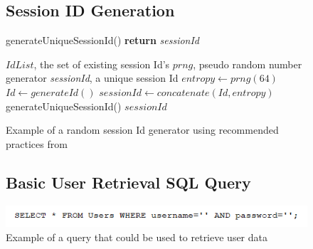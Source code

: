 \documentclass{ueacmpstyle}
\begin{document}
          \begin{figure}[ht]
            \subsection{Session ID Generation}
            \label{sec:session-id-gen}
            \centering
            \begin{algorithm}[H]
            \caption{generateUniqueSessionId() {\bf return} \emph{sessionId}}
              \begin{algorithmic}[1]
                \Require $IdList$, the set of existing session Id's
                \Require $prng$, pseudo random number generator
                \Ensure \emph{sessionId}, a unique session Id
                \State $entropy \leftarrow prng(64)$
                \State $Id \leftarrow generateId()$
                \State $sessionId \leftarrow concatenate(Id, entropy)$
                  \State generateUniqueSessionId()
                \EndIf
                \State \Return $sessionId$
              \end{algorithmic}
            \end{algorithm}
            \caption{Example of a random session Id generator using recommended practices 
                      from \cite{OWASPSessionManagement}}
            \label{fig:session-id-gen}
          \end{figure}

          \begin{figure}
            \subsection{Basic User Retrieval SQL Query}
            \label{sec:sql-query}
            \includegraphics{basicSqlQuery}
            \caption{Example of a query that could be used to retrieve user data}
          \end{figure}
\end{document}
